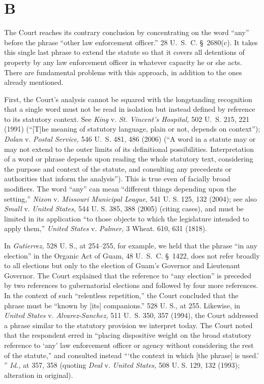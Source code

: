 \section{B}

  The Court reaches its contrary conclusion by concentrating on the word ``any'' before the phrase ``other law enforcement officer.'' 28 U.~S.~C. \S~2680(c). It takes this single last phrase to extend the statute so that it covers all detentions of property by any law enforcement officer in whatever capacity he or she acts. There are fundamental problems with this approach, in addition to the ones already mentioned.\newpage 

  First, the Court's analysis cannot be squared with the longstanding recognition that a single word must not be read in isolation but instead defined by reference to its statutory context. See \emph{King} v. \emph{St. Vincent's Hospital,} 502 U.~S. 215, 221 (1991) (``[T]he meaning of statutory language, plain or not, depends on context''); \emph{Dolan} v. \emph{Postal Service,} 546 U.~S. 481, 486 (2006) (``A word in a statute may or may not extend to the outer limits of its definitional possibilities. Interpretation of a word or phrase depends upon reading the whole statutory text, considering the purpose and context of the statute, and consulting any precedents or authorities that inform the analysis''). This is true even of facially broad modifiers. The word ``any'' can mean ``different things depending upon the setting,'' \emph{Nixon} v. \emph{Missouri Municipal League,} 541 U. S. 125, 132 (2004); see also \emph{Small} v. \emph{United States,} 544 U. S. 385, 388 (2005) (citing cases), and must be limited in its application ``to those objects to which the legislature intended to apply them,'' \emph{United States} v. \emph{Palmer,} 3 Wheat. 610, 631 (1818).

  In \emph{Gutierrez,} 528 U. S., at 254--255, for example, we held that the phrase ``in any election'' in the Organic Act of Guam, 48 U.~S.~C. \S~1422, does not refer broadly to all elections but only to the election of Guam's Governor and Lieutenant Governor. The Court explained that the reference to ``any election'' is preceded by two references to gubernatorial elections and followed by four more references. In the context of such ``relentless repetition,'' the Court concluded that the phrase must be ``known by [its] companions.'' 528 U. S., at 255. Likewise, in \emph{United States} v. \emph{Alvarez-Sanchez,} 511 U.~S. 350, 357 (1994), the Court addressed a phrase similar to the statutory provision we interpret today. The Court noted that the respondent erred in ``placing dispositive weight on the broad statutory reference to ‘any' law enforcement officer or agency without considering the rest of the statute,'' and consulted instead ``‘the context in which [the \newpage  phrase] is used.' '' \emph{Id.,} at 357, 358 (quoting \emph{Deal} v. \emph{United States,} 508 U. S. 129, 132 (1993); alteration in original).

